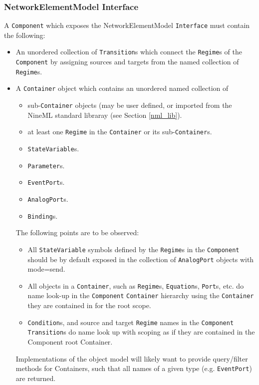 \documentclass[a4paper]{article}
\newcommand\nmlClass[1]{{\tt #1}}
\begin{document}


\subsubsection{NetworkElementModel Interface}
A \nmlClass{Component} which exposes the NetworkElementModel
\nmlClass{Interface} must contain the following:
\begin{itemize}
\item An unordered collection of \nmlClass{Transition}s which connect the \nmlClass{Regime}s
  of the \nmlClass{Component} by assigning sources and targets from the named
  collection of \nmlClass{Regime}s. 

\item A \nmlClass{Container} object which contains an unordered named collection of 
\begin{itemize}
\item sub-\nmlClass{Container} objects (may be user defined, or imported from the NineML standard libraray (see Section \ref{nml_lib}).
\item at least one \nmlClass{Regime} in the \nmlClass{Container} or its sub-\nmlClass{Container}s.
\item \nmlClass{StateVariable}s.
\item \nmlClass{Parameter}s.
\item \nmlClass{EventPort}s.
\item \nmlClass{AnalogPort}s.
\item \nmlClass{Binding}s.
\end{itemize}

The following points are to be observed:
\begin{itemize}
\item All \nmlClass{StateVariable} symbols defined by the
  \nmlClass{Regime}s in the \nmlClass{Component} should be by default
  exposed in the collection of \nmlClass{AnalogPort} objects with
  mode=send.
\item All objects in a \nmlClass{Container}, such as
  \nmlClass{Regime}s, \nmlClass{Equation}s, \nmlClass{Port}s, etc. do
  name look-up in the \nmlClass{Component} \nmlClass{Container}
  hierarchy using the \nmlClass{Container} they are contained in for
  the root scope.
\item \nmlClass{Condition}s, and source and target \nmlClass{Regime}
  names in the \nmlClass{Component} \nmlClass{Transition}s do name
  look up with scoping as if they are contained in the Component root
  Container.
\end{itemize}

Implementations of the object model will likely want to provide
query/filter methods for Containers, such that all names of a given
type (e.g. \nmlClass{EventPort}) are returned.

\end{itemize}
\end{document}
